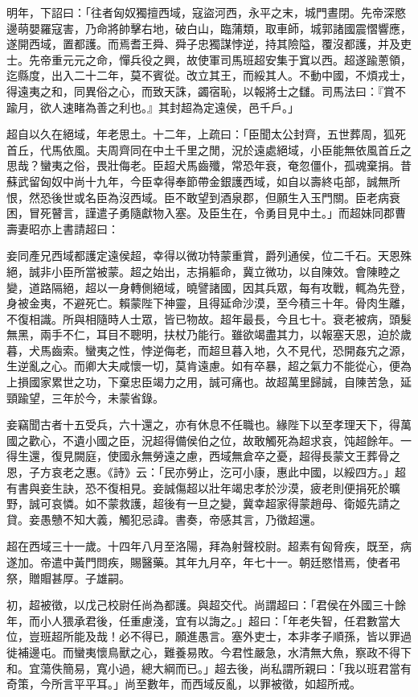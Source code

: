 \begin{pinyinscope}
明年，下詔曰：「往者匈奴獨擅西域，寇盜河西，永平之末，城門晝閉。先帝深愍邊萌嬰羅寇害，乃命將帥擊右地，破白山，臨蒲類，取車師，城郭諸國震慴響應，遂開西域，置都護。而焉耆王舜、舜子忠獨謀悖逆，持其險隘，覆沒都護，并及吏士。先帝重元元之命，憚兵役之興，故使軍司馬班超安集于窴以西。超遂踰蔥領，迄縣度，出入二十二年，莫不賓從。改立其王，而綏其人。不動中國，不煩戎士，得遠夷之和，同異俗之心，而致天誅，蠲宿恥，以報將士之讎。司馬法曰：『賞不踰月，欲人速睹為善之利也。』其封超為定遠侯，邑千戶。」

超自以久在絕域，年老思土。十二年，上疏曰：「臣聞太公封齊，五世葬周，狐死首丘，代馬依風。夫周齊同在中土千里之閒，況於遠處絕域，小臣能無依風首丘之思哉？蠻夷之俗，畏壯侮老。臣超犬馬齒殲，常恐年衰，奄忽僵仆，孤魂棄捐。昔蘇武留匈奴中尚十九年，今臣幸得奉節帶金銀護西域，如自以壽終屯部，誠無所恨，然恐後世或名臣為沒西域。臣不敢望到酒泉郡，但願生入玉門關。臣老病衰困，冒死瞽言，謹遣子勇隨獻物入塞。及臣生在，令勇目見中土。」而超妹同郡曹壽妻昭亦上書請超曰：

妾同產兄西域都護定遠侯超，幸得以微功特蒙重賞，爵列通侯，位二千石。天恩殊絕，誠非小臣所當被蒙。超之始出，志捐軀命，冀立微功，以自陳效。會陳睦之變，道路隔絕，超以一身轉側絕域，曉譬諸國，因其兵眾，每有攻戰，輒為先登，身被金夷，不避死亡。賴蒙陛下神靈，且得延命沙漠，至今積三十年。骨肉生離，不復相識。所與相隨時人士眾，皆已物故。超年最長，今且七十。衰老被病，頭髮無黑，兩手不仁，耳目不聰明，扶杖乃能行。雖欲竭盡其力，以報塞天恩，迫於歲暮，犬馬齒索。蠻夷之性，悖逆侮老，而超旦暮入地，久不見代，恐開姦宄之源，生逆亂之心。而卿大夫咸懷一切，莫肯遠慮。如有卒暴，超之氣力不能從心，便為上損國家累世之功，下棄忠臣竭力之用，誠可痛也。故超萬里歸誠，自陳苦急，延頸踰望，三年於今，未蒙省錄。

妾竊聞古者十五受兵，六十還之，亦有休息不任職也。緣陛下以至孝理天下，得萬國之歡心，不遺小國之臣，況超得備侯伯之位，故敢觸死為超求哀，饨超餘年。一得生還，復見闕庭，使國永無勞遠之慮，西域無倉卒之憂，超得長蒙文王葬骨之恩，子方哀老之惠。《詩》云：「民亦勞止，汔可小康，惠此中國，以綏四方。」超有書與妾生訣，恐不復相見。妾誠傷超以壯年竭忠孝於沙漠，疲老則便捐死於曠野，誠可哀憐。如不蒙救護，超後有一旦之變，冀幸超家得蒙趙母、衛姬先請之貸。妾愚戇不知大義，觸犯忌諱。書奏，帝感其言，乃徵超還。

超在西域三十一歲。十四年八月至洛陽，拜為射聲校尉。超素有匈脅疾，既至，病遂加。帝遣中黃門問疾，賜醫藥。其年九月卒，年七十一。朝廷愍惜焉，使者弔祭，贈賵甚厚。子雄嗣。

初，超被徵，以戊己校尉任尚為都護。與超交代。尚謂超曰：「君侯在外國三十餘年，而小人猥承君後，任重慮淺，宜有以誨之。」超曰：「年老失智，任君數當大位，豈班超所能及哉！必不得已，願進愚言。塞外吏士，本非孝子順孫，皆以罪過徙補邊屯。而蠻夷懷鳥獸之心，難養易敗。今君性嚴急，水清無大魚，察政不得下和。宜蕩佚簡易，寬小過，總大綱而已。」超去後，尚私謂所親曰：「我以班君當有奇策，今所言平平耳。」尚至數年，而西域反亂，以罪被徵，如超所戒。


\end{pinyinscope}
